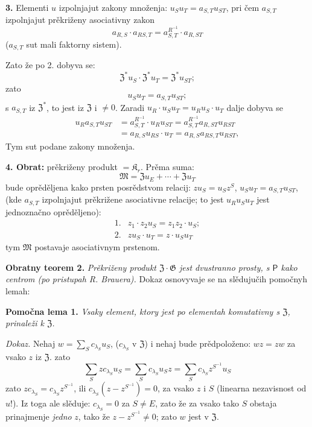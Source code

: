 \documentclass[11pt]{article}
\begin{document}
\noindent\textbf{3.} Elementi \(u\) izpolnjajut zakony množenja: \(u_Su_T=a_{S,T}u_{ST}\), pri čem \(a_{S,T}\) izpolnjajut prěkriženy asociativny zakon
\[
a_{R,S}\cdot a_{RS,T}=a_{S,T}^{R^{-1}}\cdot a_{R,ST}
\]
(\(a_{S,T}\) sut mali faktorny sistem).

Zato že po 2. dobyva se:
\[
\mathfrak Z^*u_S\cdot\mathfrak Z^*u_T=\mathfrak Z^*u_{ST};
\]
zato
\[
u_Su_T=a_{S,T}u_{ST};
\]
s \(a_{S,T}\) iz \(\mathfrak Z^*\), to jest iz \(\mathfrak Z\) i \(\neq0\). Zaradi \(u_R\cdot u_Su_T=u_Ru_S\cdot u_T\) dalje dobyva se
\[
\begin{aligned}
u_Ra_{S,T}u_{ST}
&=a_{S,T}^{R^{-1}}\cdot u_Ru_{ST}
 =a_{S,T}^{R^{-1}}a_{R,ST}u_{RST}\\
&=a_{R,S}u_{RS}\cdot u_T
 =a_{R,S}a_{RS,T}u_{RST},
\end{aligned}
\]
Tym sut podane zakony množenja.

\noindent\textbf{4. Obrat:} prěkriženy produkt \(=\mathfrak K_r\). Prěma suma:
\[
\mathfrak M=\mathfrak Zu_E+\cdots+\mathfrak Zu_T
\]
bude oprěděljena kako prsten posrědstvom relacij: \(zu_S=u_Sz^S\), \(u_Su_T=a_{S,T}u_{ST}\), (kde \(a_{S,T}\) izpolnjajut prěkrižene asociativne relacije; to jest \(u_Ru_Su_T\) jest jednoznačno oprěděljeno):
\[
\begin{array}{ll}
1.&z_1\cdot z_2u_S=z_1z_2\cdot u_S;\\[2pt]
2.&zu_S\cdot u_T=z\cdot u_Su_T
\end{array}
\]
tym \(\mathfrak M\) postavaje asociativnym prstenom.

\noindent\textbf{Obratny teorem 2.} \emph{Prěkriženy produkt \(\mathfrak Z\cdot\mathfrak G\) jest dvustranno prosty, s \(\mathsf{P}\) kako centrom (po pristupah R. Brauera).} Dokaz osnovyvaje se na slědujučih pomočnyh lemah:

\noindent\textbf{Pomočna lema 1.} \emph{Vsaky element, ktory jest po elementah komutativny s \(\mathfrak Z\), prinaleži k \(\mathfrak Z\).}

\noindent\emph{Dokaz.} Nehaj \(w=\sum_S c_{\lambda_S}u_S\), (\(c_{\lambda_S}\) v \(\mathfrak Z\)) i nehaj bude prědpoloženo: \(wz=zw\) za vsako \(z\) iz \(\mathfrak Z\). zato
\[
\sum_S zc_{\lambda_S}u_S
 =\sum_S c_{\lambda_S}u_Sz
 =\sum_S c_{\lambda_S}z^{S^{-1}}u_S
\]
zato \(zc_{\lambda_S}=c_{\lambda_S}z^{S^{-1}}\), ili \(c_{\lambda_S}(z-z^{S^{-1}})=0\), za vsako \(z\) i \(S\) (linearna nezavisnost od \(u\)!). Iz toga ale slěduje: \(c_{\lambda_S}=0\) za \(S\neq E\), zato že za vsako tako \(S\) obstaja prinajmenje \emph{jedno} \(z\), tako že \(z-z^{S^{-1}}\neq0\); zato \(w\) jest v \(\mathfrak Z\).
\end{document}
